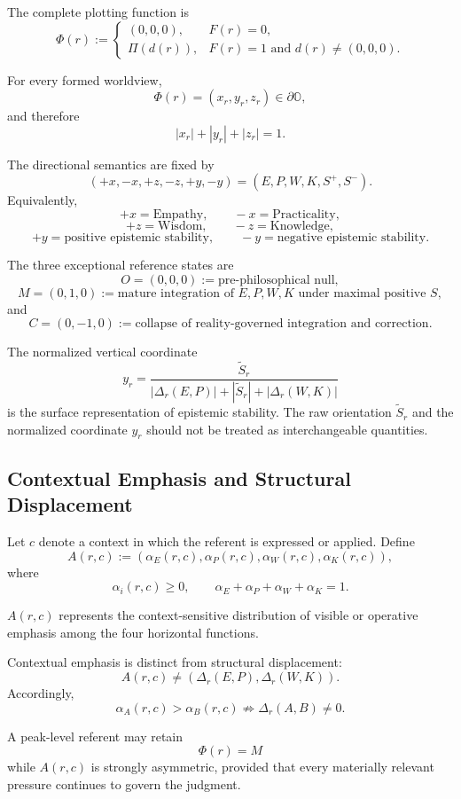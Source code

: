 \documentclass[11pt]{article}
\begin{document}
The complete plotting function is
\[
\boxed{
\Phi(r):=
\begin{cases}
(0,0,0),
&
F(r)=0,
\\[6pt]
\Pi(d(r)),
&
F(r)=1\text{ and }d(r)\neq(0,0,0).
\end{cases}
}
\]

For every formed worldview,
\[
\Phi(r)=(x_r,y_r,z_r)\in\partial\mathbb O,
\]
and therefore
\[
|x_r|+|y_r|+|z_r|=1.
\]

The directional semantics are fixed by
\[
(+x,-x,+z,-z,+y,-y)
=
(E,P,W,K,S^{+},S^{-}).
\]
Equivalently,
\[
+x=\text{Empathy},
\qquad
-x=\text{Practicality},
\]
\[
+z=\text{Wisdom},
\qquad
-z=\text{Knowledge},
\]
\[
+y=\text{positive epistemic stability},
\qquad
-y=\text{negative epistemic stability}.
\]

The three exceptional reference states are
\[
O=(0,0,0)
:=
\text{pre-philosophical null},
\]
\[
M=(0,1,0)
:=
\text{mature integration of }E,P,W,K
\text{ under maximal positive }S,
\]
and
\[
C=(0,-1,0)
:=
\text{collapse of reality-governed integration and correction}.
\]

The normalized vertical coordinate
\[
y_r
=
\frac{\widetilde S_r}
{
|\Delta_r(E,P)|
+
|\widetilde S_r|
+
|\Delta_r(W,K)|
}
\]
is the surface representation of epistemic stability. The raw orientation $\widetilde S_r$ and the normalized coordinate $y_r$ should not be treated as interchangeable quantities.

\subsection{Contextual Emphasis and Structural Displacement}

Let $c$ denote a context in which the referent is expressed or applied. Define
\[
A(r,c)
:=
\left(
\alpha_E(r,c),
\alpha_P(r,c),
\alpha_W(r,c),
\alpha_K(r,c)
\right),
\]
where
\[
\alpha_i(r,c)\geq0,
\qquad
\alpha_E+\alpha_P+\alpha_W+\alpha_K=1.
\]

$A(r,c)$ represents the context-sensitive distribution of visible or operative emphasis among the four horizontal functions.

Contextual emphasis is distinct from structural displacement:
\[
A(r,c)
\neq
\left(
\Delta_r(E,P),
\Delta_r(W,K)
\right).
\]
Accordingly,
\[
\alpha_A(r,c)>\alpha_B(r,c)
\not\Longrightarrow
\Delta_r(A,B)\neq0.
\]

A peak-level referent may retain
\[
\Phi(r)=M
\]
while $A(r,c)$ is strongly asymmetric, provided that every materially relevant pressure continues to govern the judgment.
\end{document}
